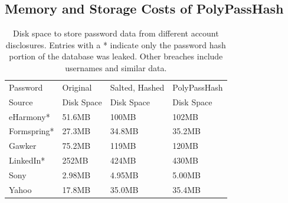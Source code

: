 

\subsection{Memory and Storage Costs of PolyPassHash}


\begin{table}[t]
{\scriptsize
\begin{tabular}{|l|l|l|l|}
\hline
Password & Original & Salted, Hashed & PolyPassHash \\
Source & Disk Space & Disk Space & Disk Space\\
\hline
\hline
eHarmony* & 51.6MB & 100MB & 102MB \\
\hline
Formspring* & 27.3MB & 34.8MB & 35.2MB \\
\hline
Gawker & 75.2MB & 119MB & 120MB \\
\hline
LinkedIn* & 252MB & 424MB & 430MB \\
\hline
Sony & 2.98MB & 4.95MB & 5.00MB  \\
\hline
Yahoo & 17.8MB & 35.0MB & 35.4MB \\
\hline
\end{tabular}
}
\caption{Disk space to store password data from different account disclosures.
Entries with a * indicate only the password hash portion of the database
was leaked.   Other breaches include usernames and similar data.  }
	\label{tab:extrahashcost}  
\end{table}




